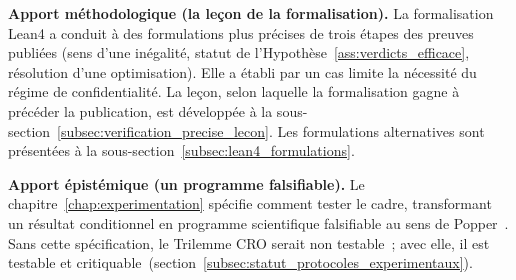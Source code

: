 \begin{sloppypar}
\textbf{Apport m\'ethodologique (la le\c{c}on de la formalisation).}
La formalisation Lean4 a conduit \`a des formulations plus pr\'ecises de trois
\'etapes des preuves publi\'ees (sens d'une in\'egalit\'e, statut de
l'Hypoth\`ese~\ref{ass:verdicts_efficace}, r\'esolution d'une optimisation). Elle a \'etabli par un cas
limite la n\'ecessit\'e du r\'egime de confidentialit\'e. La le\c{c}on, selon
laquelle la formalisation gagne \`a pr\'ec\'eder la publication, est d\'evelopp\'ee
\`a la sous-section~\ref{subsec:verification_precise_lecon}. Les formulations
alternatives sont pr\'esent\'ees \`a la
sous-section~\ref{subsec:lean4_formulations}.

\textbf{Apport \'epist\'emique (un programme falsifiable).} Le
chapitre~\ref{chap:experimentation} sp\'ecifie comment tester le
cadre, transformant un r\'esultat conditionnel en programme scientifique
falsifiable au sens de Popper~\cite{Popper1934}. Sans cette
sp\'ecification, le Trilemme CRO serait non testable~; avec elle, il est
testable et critiquable~(section~\ref{subsec:statut_protocoles_experimentaux}).

\end{sloppypar}

